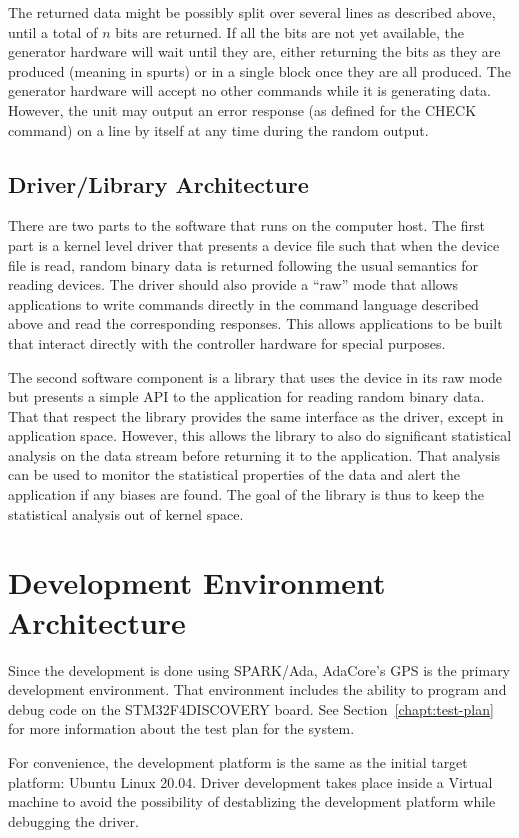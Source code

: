 The returned data might be possibly split over several lines as described above, until a total
of $n$ bits are returned. If all the bits are not yet available, the generator hardware will
wait until they are, either returning the bits as they are produced (meaning in spurts) or in a
single block once they are all produced. The generator hardware will accept no other commands
while it is generating data. However, the unit may output an error response (as defined for the
CHECK command) on a line by itself at any time during the random output.

\subsection{Driver/Library Architecture}

There are two parts to the software that runs on the computer host. The first part is a kernel
level driver that presents a device file such that when the device file is read, random binary
data is returned following the usual semantics for reading devices. The driver should also
provide a ``raw'' mode that allows applications to write commands directly in the command
language described above and read the corresponding responses. This allows applications to be
built that interact directly with the controller hardware for special purposes.

The second software component is a library that uses the device in its raw mode but presents a
simple API to the application for reading random binary data. That that respect the library
provides the same interface as the driver, except in application space. However, this allows the
library to also do significant statistical analysis on the data stream before returning it to
the application. That analysis can be used to monitor the statistical properties of the data and
alert the application if any biases are found. The goal of the library is thus to keep the
statistical analysis out of kernel space.

\section{Development Environment Architecture}

Since the development is done using SPARK/Ada, AdaCore's GPS is the primary development
environment. That environment includes the ability to program and debug code on the
STM32F4DISCOVERY board. See Section~\ref{chapt:test-plan} for more information about the test
plan for the system.

For convenience, the development platform is the same as the initial target platform: Ubuntu
Linux 20.04. Driver development takes place inside a Virtual machine to avoid the possibility of
destablizing the development platform while debugging the driver.
